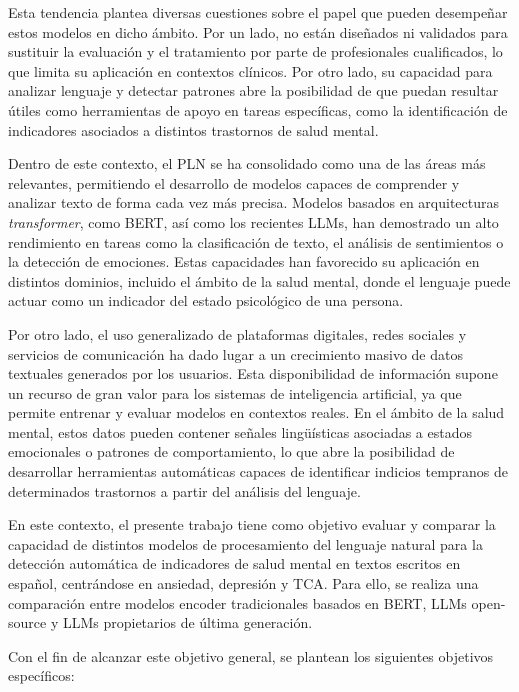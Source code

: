 Esta tendencia plantea diversas cuestiones sobre el papel que pueden desempeñar estos modelos en dicho ámbito. Por un lado, no están diseñados ni validados para sustituir la evaluación y el tratamiento por parte de profesionales cualificados, lo que limita su aplicación en contextos clínicos. Por otro lado, su capacidad para analizar lenguaje y detectar patrones abre la posibilidad de que puedan resultar útiles como herramientas de apoyo en tareas específicas, como la identificación de indicadores asociados a distintos trastornos de salud mental.

Dentro de este contexto, el \ac{PLN} se ha consolidado como una de las áreas más relevantes, permitiendo el desarrollo de modelos capaces de comprender y analizar texto de forma cada vez más precisa. Modelos basados en arquitecturas \textit{transformer}, como \ac{BERT}, así como los recientes \acp{LLM}, han demostrado un alto rendimiento en tareas como la clasificación de texto, el análisis de sentimientos o la detección de emociones. Estas capacidades han favorecido su aplicación en distintos dominios, incluido el ámbito de la salud mental, donde el lenguaje puede actuar como un indicador del estado psicológico de una persona.

Por otro lado, el uso generalizado de plataformas digitales, redes sociales y servicios de comunicación ha dado lugar a un crecimiento masivo de datos textuales generados por los usuarios. Esta disponibilidad de información supone un recurso de gran valor para los sistemas de inteligencia artificial, ya que permite entrenar y evaluar modelos en contextos reales. En el ámbito de la salud mental, estos datos pueden contener señales lingüísticas asociadas a estados emocionales o patrones de comportamiento, lo que abre la posibilidad de desarrollar herramientas automáticas capaces de identificar indicios tempranos de determinados trastornos a partir del análisis del lenguaje.

En este contexto, el presente trabajo tiene como objetivo evaluar y comparar la capacidad de distintos modelos de procesamiento del lenguaje natural para la detección automática de indicadores de salud mental en textos escritos en español, centrándose en ansiedad, depresión y \ac{TCA}. Para ello, se realiza una comparación entre modelos encoder tradicionales basados en \ac{BERT}, \acp{LLM} open-source y \acp{LLM} propietarios de última generación.

Con el fin de alcanzar este objetivo general, se plantean los siguientes objetivos específicos:

